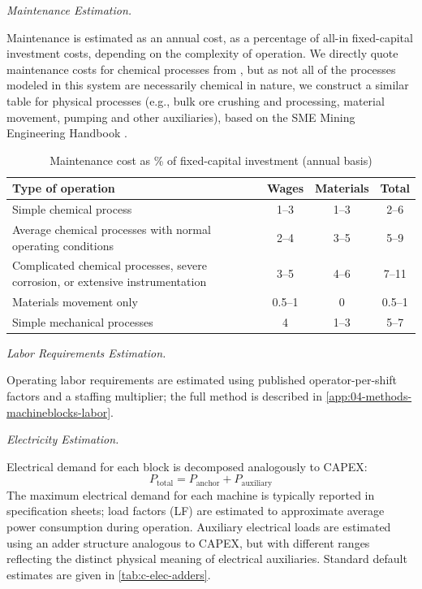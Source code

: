 \medskip
\noindent\textit{Maintenance Estimation.}\quad

Maintenance is estimated as an annual cost, as a percentage of all-in fixed-capital investment costs, depending on the complexity of operation. We directly quote maintenance costs for chemical processes from \citet{petersPlantDesignEconomics1991}, but as not all of the processes modeled in this system are necessarily chemical in nature, we construct a similar table for physical processes (e.g., bulk ore crushing and processing, material movement, pumping and other auxiliaries), based on the SME Mining Engineering Handbook \citep{darlingSMEMiningEngineering2011}. 

\begin{table}[h]
\centering
\caption{Maintenance cost as \% of fixed-capital investment (annual basis)}
\label{tab:c-maintenace-fraction}
\begin{tabular}{p{7cm}ccc}
\hline
\textbf{Type of operation} & \textbf{Wages} & \textbf{Materials} & \textbf{Total} \\
\hline
Simple chemical process & 1--3 & 1--3 & 2--6 \\
Average chemical processes with normal operating conditions & 2--4 & 3--5 & 5--9 \\
Complicated chemical processes, severe corrosion, or extensive instrumentation & 3--5 & 4--6 & 7--11 \\
Materials movement only & 0.5--1 & 0 & 0.5--1 \\
Simple mechanical processes & 4 & 1--3 & 5--7 \\
\hline
\end{tabular}
\end{table}

\medskip
\noindent\textit{Labor Requirements Estimation.}\quad

Operating labor requirements are estimated using published operator-per-shift factors
and a staffing multiplier; the full method is described in
\ref{app:04-methods-machineblocks-labor}.

\medskip
\noindent\textit{Electricity Estimation.}\quad

Electrical demand for each block is decomposed analogously to CAPEX:
\begin{equation}
    P_{\text{total}} = P_{\text{anchor}} + P_{\text{auxiliary}}
\end{equation}
The maximum electrical demand for each machine is typically reported in specification sheets; load factors (LF) are estimated to approximate average power consumption during operation. Auxiliary electrical loads are estimated using an adder structure analogous to CAPEX, but with different ranges reflecting the distinct physical meaning of electrical auxiliaries. Standard default estimates are given in \ref{tab:c-elec-adders}.

